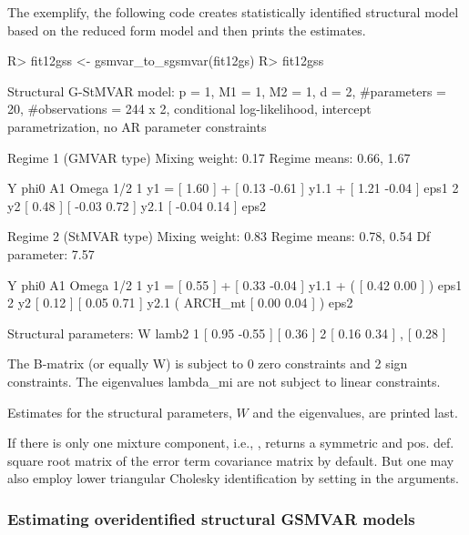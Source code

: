 \documentclass[nojss]{jss}
\begin{document}
The exemplify, the following code creates statistically identified structural model based on the reduced form model  and then prints the estimates.
%
\begin{CodeChunk}
\begin{CodeInput}
R> fit12gss <- gsmvar_to_sgsmvar(fit12gs)
R> fit12gss
\end{CodeInput}
\begin{CodeOutput}
Structural G-StMVAR model:
 p = 1, M1 = 1, M2 = 1, d = 2, #parameters = 20, #observations = 244 x 2,
 conditional log-likelihood, intercept parametrization, no AR parameter
 constraints

Regime 1 (GMVAR type)
Mixing weight: 0.17
Regime means: 0.66, 1.67

   Y     phi0          A1                  Omega         1/2
1 y1 = [ 1.60 ] + [  0.13 -0.61 ] y1.1 + [  1.21 -0.04 ]     eps1
2 y2   [ 0.48 ]   [ -0.03  0.72 ] y2.1   [ -0.04  0.14 ]     eps2

Regime 2 (StMVAR type)
Mixing weight: 0.83
Regime means: 0.78, 0.54
Df parameter:  7.57

   Y     phi0          A1                            Omega          1/2
1 y1 = [ 0.55 ] + [  0.33 -0.04 ] y1.1 + (         [  0.42 0.00 ] )     eps1
2 y2   [ 0.12 ]   [  0.05  0.71 ] y2.1   ( ARCH_mt [  0.00 0.04 ] )     eps2

Structural parameters:
        W             lamb2
1 [  0.95 -0.55 ]   [  0.36 ]
2 [  0.16  0.34 ] , [  0.28 ]

The B-matrix (or equally W) is subject to 0 zero constraints and 2 sign
constraints. The eigenvalues lambda_{mi} are not subject to linear constraints.
\end{CodeOutput}
\end{CodeChunk}
%
Estimates for the structural parameters, $W$ and the eigenvalues, are printed last.

If there is only one mixture component, i.e., ,  returns a symmetric and pos. def. square root matrix of the error term covariance matrix by default. But one may also employ lower triangular Cholesky identification by setting  in the arguments.

\subsubsection{Estimating overidentified structural GSMVAR models}
\end{document}
